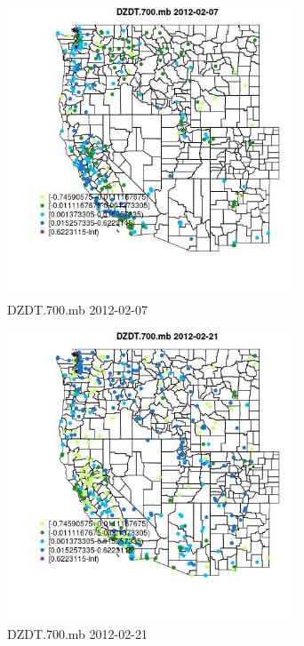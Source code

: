 \begin{figure} 
\centering  
\includegraphics[width=0.77\textwidth]{Code_Outputs/Report_ML_input_PM25_Step4_part_f_de_duplicated_aveswNAs_MapObsDZDT700mb2012-02-07.jpg} 
\caption{\label{fig:Report_ML_input_PM25_Step4_part_f_de_duplicated_aveswNAsMapObsDZDT700mb2012-02-07}DZDT.700.mb 2012-02-07} 
\end{figure} 
 

\begin{figure} 
\centering  
\includegraphics[width=0.77\textwidth]{Code_Outputs/Report_ML_input_PM25_Step4_part_f_de_duplicated_aveswNAs_MapObsDZDT700mb2012-02-21.jpg} 
\caption{\label{fig:Report_ML_input_PM25_Step4_part_f_de_duplicated_aveswNAsMapObsDZDT700mb2012-02-21}DZDT.700.mb 2012-02-21} 
\end{figure} 
 

